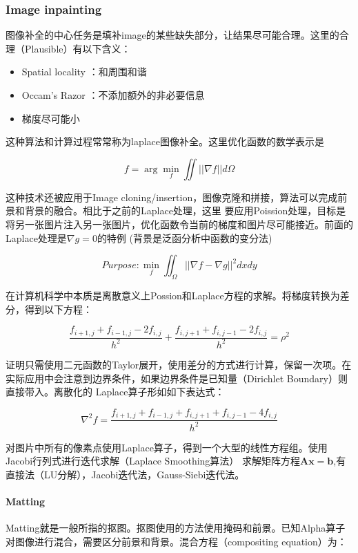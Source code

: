 \documentclass{ctexart}
\theoremstyle{cnthm}
\begin{document}
\subsubsection{Image inpainting}

图像补全的中心任务是填补image的某些缺失部分，让结果尽可能合理。这里的合理（Plausible）有以下含义：

\begin{itemize}
    \item Spatial locality ：和周围和谐
    \item Occam’s Razor ：不添加额外的非必要信息
    \item 梯度尽可能小
\end{itemize}

这种算法和计算过程常常称为laplace图像补全。这里优化函数的数学表示是

\[
f = \arg \min_f \iint ||\nabla f|| d\Omega
\]

这种技术还被应用于Image cloning/insertion，图像克隆和拼接，算法可以完成前景和背景的融合。相比于之前的Laplace处理，这里
要应用Poission处理，目标是将另一张图片注入另一张图片，优化函数令当前的梯度和图片尽可能接近。前面的Laplace处理是$\nabla g = 0$的特例
(背景是泛函分析中函数的变分法)

\[
Purpose: \min_f \iint_{\Omega} ||\nabla f - \nabla g|| ^ 2 dxdy
\]

在计算机科学中本质是离散意义上Possion和Laplace方程的求解。将梯度转换为差分，得到以下方程：

\[
\frac{f_{i+1,j} + f_{i-1,j} - 2f_{i,j}}{h^2} + \frac{f_{i,j+1} + f_{i,j-1} - 2f_{i,j}}{h^2} = \rho^2
\]

证明只需使用二元函数的Taylor展开，使用差分的方式进行计算，保留一次项。在实际应用中会注意到边界条件，如果边界条件是已知量（Dirichlet Boundary）则直接带入。离散化的
Laplace算子形如如下表达式：

\[
\nabla^2 f = \frac{f_{i+1,j} + f_{i-1,j} + f_{i,j+1} + f_{i,j-1} - 4f_{i,j}
}{h^2}
\]

对图片中所有的像素点使用Laplace算子，得到一个大型的线性方程组。使用Jacobi行列式进行迭代求解（Laplace Smoothing算法）
求解矩阵方程$\mathbf{Ax} = \mathbf{b}$,有直接法（LU分解），Jacobi迭代法，Gauss-Siebi迭代法。

\paragraph{Matting}

Matting就是一般所指的抠图。抠图使用的方法使用掩码和前景。已知Alpha算子对图像进行混合，需要区分前景和背景。混合方程（compositing equation）为：
\end{document}
